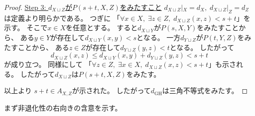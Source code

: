 \documentclass[report, notitlepage]{jlreq}
\newcommand{\GH}{\mathrm{GH}}
\begin{document}
\begin{proof}
    \uline{Step 3: $d_{X \sqcup Z}$が$P(s + t, X, Z)$をみたすこと} \quad
    $d_{X \sqcup Z}|_X = d_X, \;
        d_{X \sqcup Z}|_Z = d_Z$
    は定義より明らかである。
    つぎに
    「$\forall x \in X, \; \exists z \in Z, \; d_{X \sqcup Z}(x, z) < s + t$」を示す。
    そこで$x \in X$を任意とする。
    すると$d_{X \sqcup Y}$が$P(s, X, Y)$をみたすことから、
    ある$y \in Y$が存在して$d_{X \sqcup Y}(x, y) < s$となる。
    一方$d_{Y \sqcup Z}$が$P(t, Y, Z)$をみたすことから、
    ある$z \in Z$が存在して$d_{Y \sqcup Z}(y, z) < t$となる。
    したがって
    \begin{equation}
        d_{X \sqcup Z}(x, z)
            \le
                d_{X \sqcup Y}(x, y) + d_{Y \sqcup Z}(y, z)
            <
                s + t
    \end{equation}
    が成り立つ。
    同様にして
    「$\forall z \in Z, \; \exists x \in X, \; d_{X \sqcup Z}(x, z) < s + t$」も示される。
    したがって$d_{X \sqcup Z}$は$P(s + t, X, Z)$をみたす。

    以上より
    $s + t \in A_{X, Z}$が示された。
    したがって$d_\GH$は三角不等式をみたす。
\end{proof}

まず非退化性の右向きの含意を示す。

\end{document}
